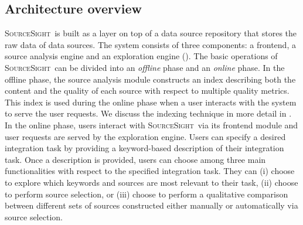 \documentclass{vldb}
\newcommand\system{\textsc{SourceSight}}
\begin{document}
\subsection{Architecture overview}
\system~is built as a layer on top of a data source repository that stores the raw data of data sources. The system consists of three components: a frontend, a source analysis engine and an exploration engine (). 
The basic operations of \system~can be divided into an {\em offline} phase and an {\em online} phase. In the offline phase, the source analysis module constructs an index describing both the content and the quality of each source with respect to multiple quality metrics. This index is used during the online phase when a user interacts with the system to serve the user requests. We discuss the indexing technique in more detail in . In the online phase, users interact with \system~via its frontend module and user requests are served by the exploration engine. Users can specify a desired integration task by providing a keyword-based description of their integration task. Once a description is provided, users can choose among three main functionalities with respect to the specified integration task. They can (i) choose to explore which keywords and sources are most relevant to their task, (ii) choose to perform source selection, or (iii) choose to perform a qualitative comparison between different sets of sources constructed either manually or automatically via source selection. %
\end{document}
